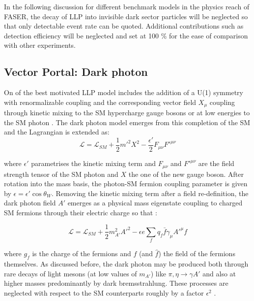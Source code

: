 		In the following discussion for different benchmark models in the physics reach of FASER, the decay of LLP into invisible dark sector particles will be neglected so that only detectable event rate can be quoted. Additional contributions such as detection efficiency will be neglected and set at 100 \% for the ease of comparison with other experiments. 
		
		
		\subsection{Vector Portal: Dark photon}
		On of the best motivated LLP model includes the addition of a U(1) symmetry with renormalizable coupling and the corresponding vector field $X_\mu$ coupling through kinetic mixing to the SM hypercharge gauge bosons  or at low energies to the SM photon \cite{FASER_LLP}. The dark photon model emerges from this completion of the SM and the Lagrangian is extended as: 
		\begin{equation}
			\mathcal{L} = \mathcal{L}_{SM} + \frac{1}{2} m'^2X^2 - \frac{\epsilon'}{2}F_{\mu \nu}F'^{\mu \nu}
		\end{equation} 
		
		where $\epsilon'$ parametrises the kinetic mixing term and $F_{\mu \nu}$ and $F'^{\mu \nu}$ are the field strength tensor of the SM photon and $X$ the one of the new gauge boson. After rotation into the mass basis, the photon-SM fermion coupling parameter is given by $\epsilon = \epsilon' \cos{\theta_W}$. Removing the kinetic mixing term after a field re-definition, the dark photon field $A'$ emerges as a physical mass eigenstate coupling to charged SM fermions through their electric charge so that \cite{FASER_LLP}: 
		
		\begin{equation}
			\mathcal{L} = \mathcal{L}_{SM} + \frac{1}{2} m_{A'}^2A'^2 - \epsilon e \sum_f q_f \bar{f} \gamma_\mu A'^\mu f 
		\end{equation} 
		
		where $g_f$ is the charge of the fermions and $f$ (and $\hat{f}$) the field of the fermions themselves. As discussed before, the dark photon may be produced both through rare decays of light mesons (at low values of $m_{A'}$) like $\pi , \eta \rightarrow \gamma A'$ and also at higher masses predominantly by dark bremsstrahlung. These processes are neglected with respect to the SM counterparts roughly by a factor $\epsilon^2$ \cite{FASER_LLP}. \\ 
		
